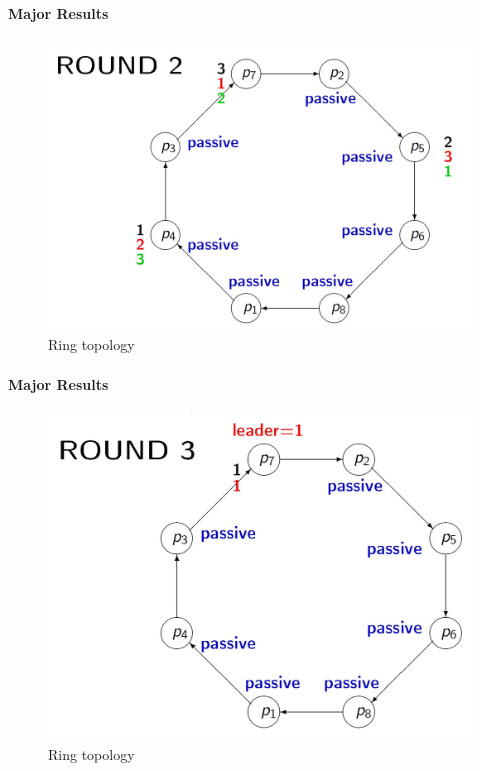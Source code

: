 \documentclass[11pt]{beamer}              %
\begin{document}
\begin{frame}{}
\framesubtitle{Major Results}

\begin{figure}
    \centering
    \includegraphics[scale=0.3]{figures/Screen15.jpg}
    \caption{Ring topology}
    \label{fig:Ring topology}
\end{figure}
\note{
}
\end{frame}


\begin{frame}{}
\framesubtitle{Major Results}

\begin{figure}
    \centering
    \includegraphics[scale=0.3]{figures/Screen16.jpg}
    \caption{Ring topology}
    \label{fig:Ring topology}
\end{figure}
\note{
}
\end{frame}
\end{document}
